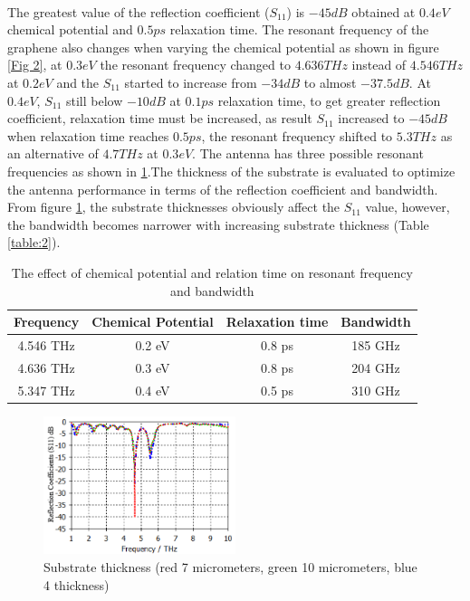 \documentclass[12pt]{suhbook}
\begin{document}
\\The greatest value of the reflection coefficient ($S_{11}$) is $-45 dB$ obtained at $0.4 eV$ chemical potential and $0.5 ps$ relaxation time. The resonant frequency of the graphene also changes when varying the chemical potential as shown in figure \ref{Fig 2}, at $0.3 eV$ the resonant frequency changed to $4.636 THz$ instead of $4.546 THz$ at $0.2 eV$ and the $S_{11}$ started to increase from $-34 dB$ to almost $-37.5 dB$. At $0.4 eV$, $S_{11}$ still below $-10 dB$ at $0.1ps$ relaxation time, to get greater reflection coefficient, relaxation time must be increased, as result $S_{11}$ increased to $-45 dB$ when relaxation time reaches $0.5 ps$, the resonant frequency shifted to $5.3 THz$ as an alternative of $4.7 THz$ at $0.3 eV$. The antenna has three possible resonant frequencies as shown in \ref{table:1}.The thickness of the substrate is evaluated to optimize the antenna performance in terms of the reflection coefficient and bandwidth. From figure \ref{Fig 3}, the substrate thicknesses obviously affect the $S_{11}$ value, however, the bandwidth becomes narrower with increasing substrate thickness (Table \ref{table:2}).
\begin{table}[hbt!]
\centering
 \begin{tabular}[hbt!]{||c c c c||} 
 \hline
 Frequency & Chemical Potential & Relaxation time & Bandwidth \\ [0.5ex] 
 \hline\hline
 4.546 THz & 0.2 eV & 0.8 ps & 185 GHz \\ 
 \hline
 4.636 THz & 0.3 eV & 0.8 ps & 204 GHz \\
 \hline
 5.347 THz & 0.4 eV & 0.5 ps & 310 GHz \\[1ex] 
 \hline
\end{tabular}
\caption{The effect of chemical potential and relation time on resonant frequency and bandwidth}
\label{table:1}
\end{table}
\begin{figure}[hbt!]
    \centering
    \includegraphics[width=0.5\textwidth]{3}
    \caption{Substrate thickness (red 7 micrometers, green 10 micrometers, blue 4 thickness)}
    \label{Fig 3}
\end{figure}
\end{document}

